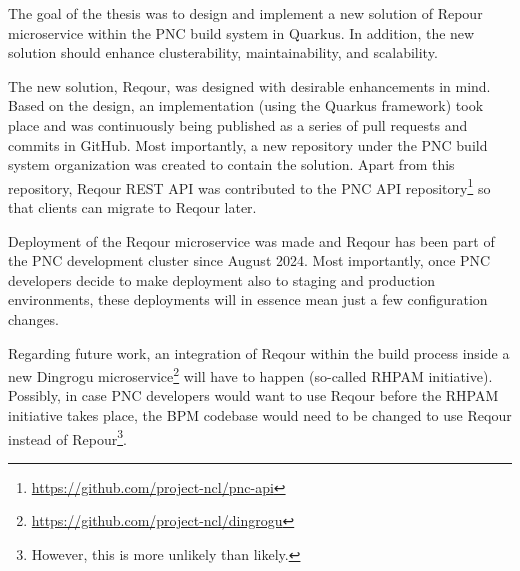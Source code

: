 \documentclass[../main.tex]{subfiles}
\begin{document}
The goal of the thesis was to design and implement a new solution of Repour microservice\cite{repour} within the PNC build system in Quarkus. In addition, the new solution should enhance clusterability, maintainability, and scalability.

The new solution, Reqour, was designed with desirable enhancements in mind. Based on the design, an implementation (using the Quarkus framework) took place and was continuously being published as a series of pull requests and commits in GitHub. Most importantly, a new repository under the PNC build system organization was created to contain the solution\cite{reqour}. Apart from this repository, Reqour REST API was contributed to the PNC API repository\footnote{\url{https://github.com/project-ncl/pnc-api}} so that clients can migrate to Reqour later.

Deployment of the Reqour microservice was made and Reqour has been part of the PNC development cluster since August 2024. Most importantly, once PNC developers decide to make deployment also to staging and production environments, these deployments will in essence mean just a few configuration changes.

Regarding future work, an integration of Reqour within the build process inside a new Dingrogu microservice\footnote{\url{https://github.com/project-ncl/dingrogu}} will have to happen (so-called RHPAM initiative). Possibly, in case PNC developers would want to use Reqour before the RHPAM initiative takes place, the BPM codebase would need to be changed to use Reqour instead of Repour\footnote{However, this is more unlikely than likely.}.
\end{document}
